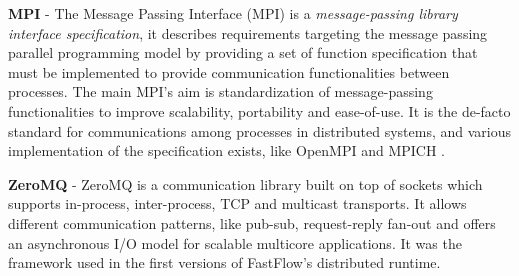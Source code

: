 %

\textbf{MPI} - The Message Passing Interface (MPI) \cite{mpi40} is a \textit{message-passing library interface specification}, it describes requirements targeting the message passing parallel programming model by providing a set of function specification that must be implemented to provide communication functionalities between processes. The main MPI's aim is standardization of message-passing functionalities to improve scalability, portability and ease-of-use. It is the de-facto standard for communications among processes in distributed systems, and various implementation of the specification exists, like OpenMPI \cite{openMPI} and MPICH \cite{MPICH}.\newline

\textbf{ZeroMQ} - ZeroMQ \cite{zeromq} is a communication library built on top of sockets which supports in-process, inter-process, TCP and multicast transports. It allows different communication patterns, like pub-sub, request-reply fan-out and offers an asynchronous I/O model for scalable multicore applications. It was the framework used in the first versions of FastFlow's distributed runtime.\newline


